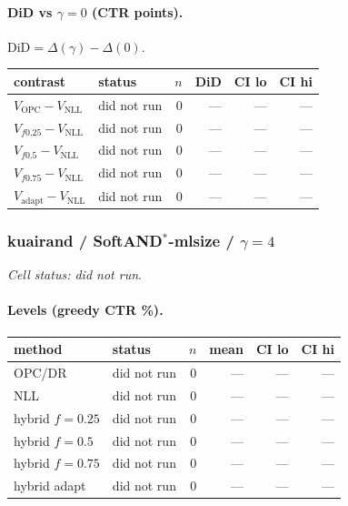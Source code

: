 \documentclass[10pt,a4paper]{article}
\begin{document}
\paragraph{DiD vs $\gamma=0$ (CTR points).} $\mathrm{DiD}=\Delta(\gamma)-\Delta(0)$.
{\centering\small\begin{tabular}{llrrrr}
\toprule contrast & status & $n$ & DiD & CI lo & CI hi \\
\midrule
$V_{\mathrm{OPC}}-V_{\mathrm{NLL}}$ & did not run & 0 & --- & --- & --- \\
$V_{f0.25}-V_{\mathrm{NLL}}$ & did not run & 0 & --- & --- & --- \\
$V_{f0.5}-V_{\mathrm{NLL}}$ & did not run & 0 & --- & --- & --- \\
$V_{f0.75}-V_{\mathrm{NLL}}$ & did not run & 0 & --- & --- & --- \\
$V_{\mathrm{adapt}}-V_{\mathrm{NLL}}$ & did not run & 0 & --- & --- & --- \\
\bottomrule\end{tabular}\par}
\bigskip
\subsubsection{kuairand / SoftAND$^*$-mlsize / $\gamma=4$}
\emph{Cell status: did not run}.
\paragraph{Levels (greedy CTR \%).}
{\centering\small\begin{tabular}{llrrrr}
\toprule method & status & $n$ & mean & CI lo & CI hi \\
\midrule
OPC/DR & did not run & 0 & --- & --- & --- \\
NLL & did not run & 0 & --- & --- & --- \\
hybrid $f{=}0.25$ & did not run & 0 & --- & --- & --- \\
hybrid $f{=}0.5$ & did not run & 0 & --- & --- & --- \\
hybrid $f{=}0.75$ & did not run & 0 & --- & --- & --- \\
hybrid adapt & did not run & 0 & --- & --- & --- \\
\bottomrule\end{tabular}\par}
\end{document}

